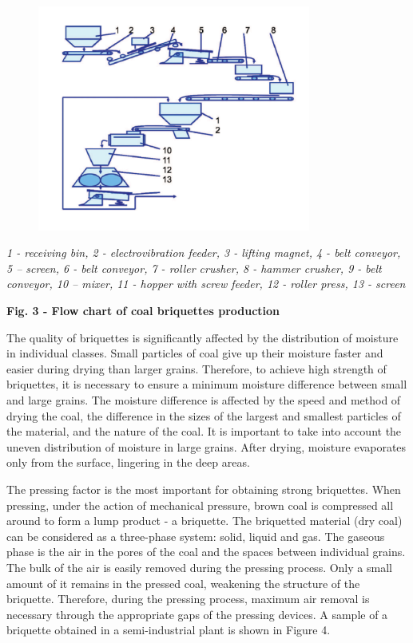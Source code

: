 \begin{figure}[H]
	\centering
	\includegraphics[width=0.8\textwidth]{media/gorn2/image5}
	\caption*{}
\end{figure}


\emph{1 - receiving bin, 2 - electrovibration feeder, 3 - lifting
magnet, 4 - belt conveyor, 5 -- screen, 6 - belt conveyor, 7 - roller
crusher, 8 - hammer crusher, 9 - belt conveyor, 10 -- mixer, 11 - hopper
with screw feeder, 12 - roller press, 13 - screen}

{\bfseries Fig. 3 - Flow chart of coal briquettes production}

The quality of briquettes is significantly affected by the distribution
of moisture in individual classes. Small particles of coal give up their
moisture faster and easier during drying than larger grains. Therefore,
to achieve high strength of briquettes, it is necessary to ensure a
minimum moisture difference between small and large grains. The moisture
difference is affected by the speed and method of drying the coal, the
difference in the sizes of the largest and smallest particles of the
material, and the nature of the coal. It is important to take into
account the uneven distribution of moisture in large grains. After
drying, moisture evaporates only from the surface, lingering in the deep
areas.

The pressing factor is the most important for obtaining strong
briquettes. When pressing, under the action of mechanical pressure,
brown coal is compressed all around to form a lump product - a
briquette. The briquetted material (dry coal) can be considered as a
three-phase system: solid, liquid and gas. The gaseous phase is the air
in the pores of the coal and the spaces between individual grains. The
bulk of the air is easily removed during the pressing process. Only a
small amount of it remains in the pressed coal, weakening the structure
of the briquette. Therefore, during the pressing process, maximum air
removal is necessary through the appropriate gaps of the pressing
devices. A sample of a briquette obtained in a semi-industrial plant is
shown in Figure 4.

